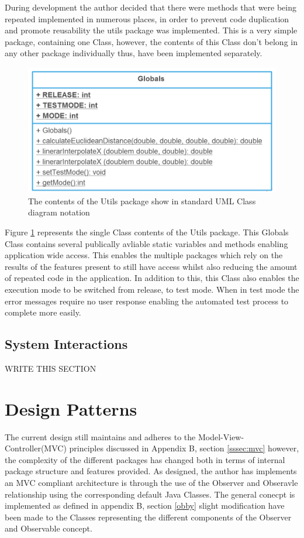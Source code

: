 During development the author decided that there were methods that were being repeated implemented in numerous places, in order to prevent code duplication and promote reusability the utils package was implemented. This is a very simple package, containing one Class, however, the contents of this Class don't belong in any other package individually thus, have been implemented separately.

\begin{figure}[H]
\centering
\includegraphics[scale=0.3]{Images/chapter4/gloabls}
\caption{The contents of the Utils package show in standard UML Class diagram notation}
\label{fig:utilsImp}
\end{figure}

Figure \ref{fig:utilsImp} represents the single Class contents of the Utils package. This Globals Class contains several publically avliable static variables and methods enabling application wide access. This enables the multiple packages which rely on the results of the features present to still have access whilst also reducing the amount of repeated code in the application. In addition to this, this Class also enables the execution mode to be switched from release, to test mode. When in test mode the error messages require no user response enabling the automated test process to complete more easily.

\subsection{System Interactions}

WRITE THIS SECTION

\section{Design Patterns}
The current design still maintains and adheres to the Model-View-Controller(MVC) principles discussed in Appendix B, section \ref{sssec:mvc} however, the complexity of the different packages has changed both in terms of internal package structure and features provided. As designed, the author has implements an MVC compliant architecture is through the use of the Observer and Obseravle relationship using the corresponding default Java Classes. The general conecpt is implemented as defined in appendix B, section \ref{obby} slight modification have been made to the Classes representing the different components of the Observer and Observable concept.

